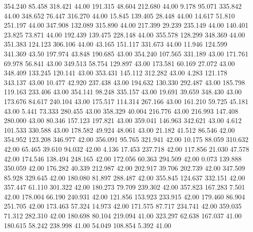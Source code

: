  354.240   85.458  318.421        44.00
 191.315   48.604  212.680        44.00
   9.178   95.071  335.842        44.00
 348.652   76.447  316.270        44.00
  15.845  139.405   28.448        44.00
  14.617   51.810  251.197        44.00
 347.908  132.089  315.890        44.00
 217.399   29.239  235.149        44.00
 140.401   23.825   73.871        44.00
 192.439  139.475  228.148        44.00
 355.578  128.299  348.369        44.00
 351.383  124.123  306.106        44.00
  43.165  151.117  331.673        44.00
  11.946  124.599  341.369        43.50
 197.974   43.848  190.685        43.00
 354.240  107.565  331.189        43.00
 171.761   69.978   56.841        43.00
 349.513   58.754  129.897        43.00
 173.581   60.169   27.072        43.00
 348.409  133.245  120.141        43.00
 353.431  145.112  312.282        43.00
   4.283  121.178  343.137        43.00
  10.477   42.920  237.438        43.00
 194.632  130.330  292.487        43.00
 185.798  119.163  233.406        43.00
 354.141   98.248  335.157        43.00
  19.691   39.659  348.430        43.00
 173.676   84.617  240.104        43.00
 175.517  114.314  267.166        43.00
 161.210   59.725   45.181        43.00
   5.441   73.333  280.455        43.00
 358.329   40.004  216.776        43.00
 216.993  147.408  280.000        43.00
  80.346  157.123  197.821        43.00
 359.041  146.963  342.621        43.00
   4.612  101.533  330.588        43.00
 178.582   49.924   48.061        43.00
  21.182   41.512   86.546        42.00
 354.952  123.208  346.977        42.00
 356.091   95.765  321.941        42.00
  10.175   88.059  310.632        42.00
  65.465   39.610   94.032        42.00
   4.136   17.453  237.718        42.00
 117.856   21.030   47.578        42.00
 174.546  138.494  248.165        42.00
 172.056   60.363  294.509        42.00
   0.073  139.888  350.059        42.00
 176.282   40.339  212.987        42.00
 202.917   39.706  202.739        42.00
 347.509   85.928  329.645        42.00
 180.080   81.897  288.487        42.00
 355.845  124.637  332.151        42.00
 357.447   61.110  301.322        42.00
 180.273   79.709  239.302        42.00
 357.823  167.283    7.501        42.00
 178.004   66.190  240.931        42.00
 121.856  153.923  233.915        42.00
 179.460   86.904  251.705        42.00
 173.463   57.324   14.973        42.00
 171.575   87.717  234.741        42.00
 359.035   71.312  282.310        42.00
 180.698   80.104  219.094        41.00
 323.297   62.638  167.037        41.00
 180.615   58.242  238.998        41.00
  54.049  108.854    5.392        41.00
